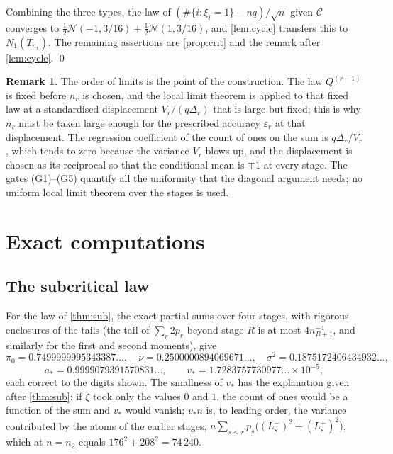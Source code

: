 \documentclass[11pt]{amsart}
\theoremstyle{definition}
\newtheorem{remark}[theorem]{Remark}
\newcommand{\Nor}{\mathcal{N}}
\newcommand{\Cond}{\mathcal{C}}
\begin{document}
Combining the three types, the law of $(\#\{i:\xi_i=1\}-nq)/\sqrt n$ given $\Cond$ converges to $\tfrac12\Nor(-1,3/16)+\tfrac12\Nor(1,3/16)$, and \cref{lem:cycle} transfers this to $N_1(T_{n_r})$. The remaining assertions are \cref{prop:crit} and the remark after \cref{lem:cycle}. \qed

\begin{remark}
The order of limits is the point of the construction. The law $Q^{(r-1)}$ is fixed before $n_r$ is chosen, and the local limit theorem is applied to that fixed law at a standardised displacement $V_r/(q\Delta_r)$ that is large but fixed; this is why $n_r$ must be taken large enough for the prescribed accuracy $\varepsilon_r$ at that displacement. The regression coefficient of the count of ones on the sum is $q\Delta_r/V_r$, which tends to zero because the variance $V_r$ blows up, and the displacement is chosen as its reciprocal so that the conditional mean is $\mp1$ at every stage. The gates (G1)--(G5) quantify all the uniformity that the diagonal argument needs; no uniform local limit theorem over the stages is used.
\end{remark}

\section{Exact computations}\label{sec:num}

\subsection{The subcritical law}

For the law of \cref{thm:sub}, the exact partial sums over four stages, with rigorous enclosures of the tails (the tail of $\sum_r2p_r$ beyond stage $R$ is at most $4n_{R+1}^{-4}$, and similarly for the first and second moments), give
\[
\pi_0=0.7499999995343387\ldots,\quad
\nu=0.2500000894069671\ldots,\quad
\sigma^2=0.1875172406434932\ldots,
\]
\[
a_*=0.9999079391570831\ldots,\qquad
v_*=1.7283757730977\ldots\times10^{-5},
\]
each correct to the digits shown. The smallness of $v_*$ has the explanation given after \cref{thm:sub}: if $\xi$ took only the values $0$ and $1$, the count of ones would be a function of the sum and $v_*$ would vanish; $v_*n$ is, to leading order, the variance contributed by the atoms of the earlier stages, $n\sum_{s<r}p_s\big((L_s^-)^2+(L_s^+)^2\big)$, which at $n=n_2$ equals $176^2+208^2=74\,240$.
\end{document}
